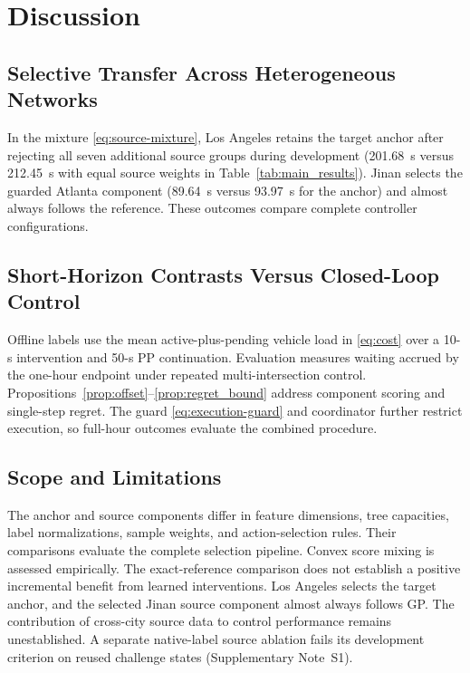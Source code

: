 \documentclass[letterpaper,journal]{IEEEtran}
\begin{document}
\section{Discussion}
\label{sec:discussion}

\subsection{Selective Transfer Across Heterogeneous Networks}
In the mixture \eqref{eq:source-mixture}, Los Angeles retains the target anchor after rejecting all seven additional source groups during development (201.68~s versus 212.45~s with equal source weights in Table~\ref{tab:main_results}). Jinan selects the guarded Atlanta component (89.64~s versus 93.97~s for the anchor) and almost always follows the reference. These outcomes compare complete controller configurations.

\subsection{Short-Horizon Contrasts Versus Closed-Loop Control}
Offline labels use the mean active-plus-pending vehicle load in \eqref{eq:cost} over a 10-s intervention and 50-s PP continuation. Evaluation measures waiting accrued by the one-hour endpoint under repeated multi-intersection control. Propositions~\ref{prop:offset}--\ref{prop:regret_bound} address component scoring and single-step regret. The guard \eqref{eq:execution-guard} and coordinator further restrict execution, so full-hour outcomes evaluate the combined procedure.

\subsection{Scope and Limitations}
\label{sec:limitations}
The anchor and source components differ in feature dimensions, tree capacities, label normalizations, sample weights, and action-selection rules. Their comparisons evaluate the complete selection pipeline. Convex score mixing is assessed empirically. The exact-reference comparison does not establish a positive incremental benefit from learned interventions. Los Angeles selects the target anchor, and the selected Jinan source component almost always follows GP. The contribution of cross-city source data to control performance remains unestablished. A separate native-label source ablation fails its development criterion on reused challenge states (Supplementary Note~S1).
\end{document}
